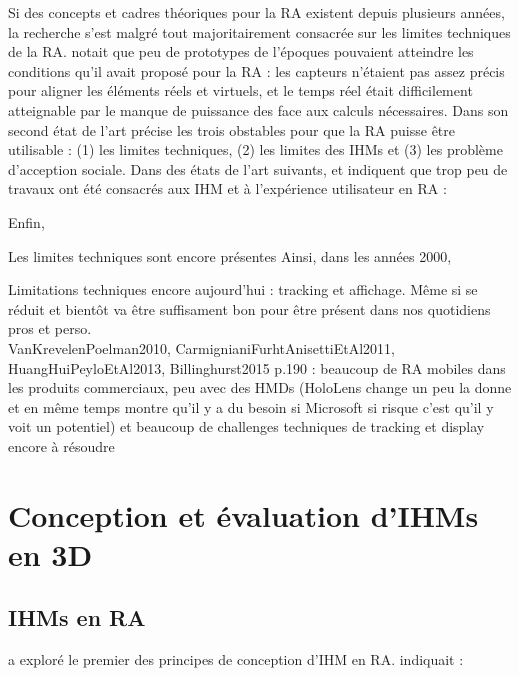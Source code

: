 
Si des concepts et cadres théoriques pour la RA existent depuis plusieurs années, la recherche s'est malgré tout majoritairement consacrée sur les limites techniques de la RA. \cite{Azuma1997} notait que peu de prototypes de l'époques pouvaient atteindre les conditions qu'il avait proposé pour la RA : les capteurs n'étaient pas assez précis pour aligner les éléments réels et virtuels, et le temps réel était difficilement atteignable par le manque de puissance des face aux calculs nécessaires. Dans son second état de l'art \cite{Azuma2001} précise les trois obstables pour que la RA puisse être utilisable : (1) les limites techniques, (2) les limites des IHMs et (3) les problème d'acception sociale. Dans des états de l'art suivants, \cite{Zhou2008} et \cite{Billinghurst2015} indiquent que trop peu de travaux ont été consacrés aux IHM et à l'expérience utilisateur en RA : %

Enfin, 

Les limites techniques sont encore présentes
Ainsi, dans les années 2000, 

Limitations techniques encore aujourd'hui : tracking et affichage. Même si se réduit et bientôt va être suffisament bon pour être présent dans nos quotidiens pros et perso.\\
VanKrevelenPoelman2010, CarmignianiFurhtAnisettiEtAl2011, HuangHuiPeyloEtAl2013, Billinghurst2015 p.190 : beaucoup de RA mobiles dans les produits commerciaux, peu avec des HMDs (HoloLens change un peu la donne et en même temps montre qu'il y a du besoin si Microsoft si risque c'est qu'il y voit un potentiel) et beaucoup de challenges techniques de tracking et display encore à résoudre


\section{Conception et évaluation d'IHMs en 3D}
\subsection{IHMs en RA}
\cite{Billinghurst2005} a exploré le premier des principes de conception d'IHM en RA. indiquait : 

